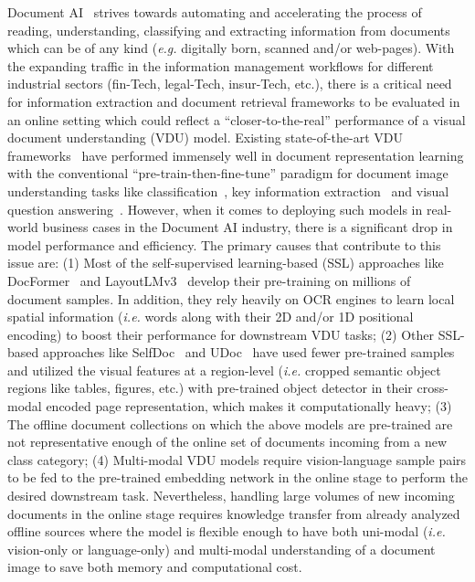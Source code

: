\documentclass[preprint,review,12pt]{elsarticle}
\newcommand{\ie}{\textit{i.e. }}
\newcommand{\eg}{\textit{e.g. }}
\begin{document}
Document AI~\cite{cui2021document} strives towards automating and accelerating the process of reading, understanding, classifying and extracting information from documents which can be of any kind (\eg digitally born, scanned and/or web-pages). With the expanding traffic in the information management workflows for different industrial sectors (fin-Tech, legal-Tech, insur-Tech, etc.), there is a critical need for information extraction and document retrieval frameworks to be evaluated in an online setting which could reflect a ``closer-to-the-real'' performance of a visual document understanding (VDU) model. Existing state-of-the-art VDU frameworks~\cite{appalaraju2021docformer, Unifieddoc, huang2022layoutlmv3, li2022dit, li2021selfdoc, powalski2021going, xu2020layoutlmv2} have performed immensely well in document representation learning with the conventional ``pre-train-then-fine-tune'' paradigm for document image understanding tasks like classification~\cite{harley2015evaluation}, key information extraction~\cite{jaume2019funsd} and visual question answering~\cite{mathew2021docvqa}. However, when it comes to deploying such models in real-world business cases in the Document AI industry, there is a significant drop in model performance and efficiency. The primary causes that contribute to this issue are: (1) Most of the self-supervised learning-based (SSL) approaches like DocFormer~\cite{appalaraju2021docformer} and LayoutLMv3~\cite{huang2022layoutlmv3} develop their pre-training on millions of document samples. In addition, they rely heavily on OCR engines to learn local spatial information (\ie words along with their 2D and/or 1D positional encoding) to boost their performance for downstream VDU tasks; (2) Other SSL-based approaches like SelfDoc~\cite{li2021selfdoc} and UDoc~\cite{Unifieddoc} have used fewer pre-trained samples and utilized the visual features at a region-level (\ie cropped semantic object regions like tables, figures, etc.) with pre-trained object detector in their cross-modal encoded page representation, which makes it computationally heavy; (3) The offline document collections on which the above models are pre-trained are not representative enough of the online set of documents incoming from a new class category; (4) Multi-modal VDU models require vision-language sample pairs to be fed to the pre-trained embedding network in the online stage to perform the desired downstream task. Nevertheless, handling large volumes of new incoming documents in the online stage requires knowledge transfer from already analyzed offline sources where the model is flexible enough to have both uni-modal (\ie vision-only or language-only) and multi-modal understanding of a document image to save both memory and computational cost.
\end{document}
